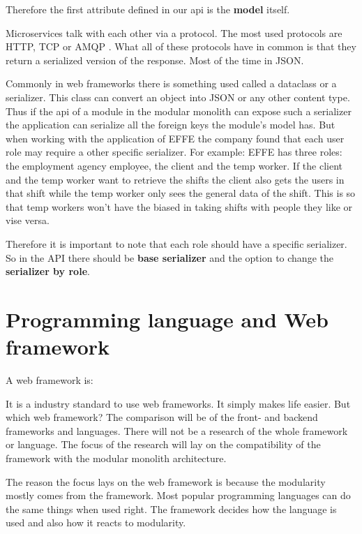 Therefore the first attribute defined in our api is the \textbf{model} itself.

Microservices talk with each other via a protocol. The most used protocols are HTTP, TCP or AMQP \cite{microservicesAPI}. What all of these protocols have in common is that they return a serialized version of the response. Most of the time in JSON.

Commonly in web frameworks there is something used called a dataclass or a serializer. This class can convert an object into JSON or any other content type. Thus if the api of a module in the modular monolith can expose such a serializer the application can serialize all the foreign keys the module's model has. But when working with the application of EFFE the company found that each user role may require a other specific serializer. For example: EFFE has three roles: the employment agency employee, the client and the temp worker. If the client and the temp worker want to retrieve the shifts the client also gets the users in that shift while the temp worker only sees the general data of the shift. This is so that temp workers won't have the biased in taking shifts with people they like or vise versa.

Therefore it is important to note that each role should have a specific serializer. So in the API there should be \textbf{base serializer} and the option to change the \textbf{serializer by role}.

\section{Programming language and Web framework}

A web framework is:


It is a industry standard to use web frameworks. It simply makes life easier. But which web framework? The comparison will be of the front- and backend frameworks and languages. There will not be a research of the whole framework or language. The focus of the research will lay on the compatibility of the framework with the modular monolith architecture.

The reason the focus lays on the web framework is because the modularity mostly comes from the framework. Most popular programming languages can do the same things when used right. The framework decides how the language is used and also how it reacts to modularity.

